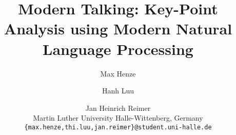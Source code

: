 \documentclass[11pt]{article}
\title{Modern Talking: Key-Point Analysis using Modern Natural Language Processing}
\author{%
  Max Henze \and Hanh Luu \and Jan Heinrich Reimer \\
  Martin Luther University Halle-Wittenberg, Germany \\ 
  \texttt{\{max.henze,thi.luu,jan.reimer\}@student.uni-halle.de}%
}
\begin{document}
\maketitle

\begin{abstract}
  
\end{abstract}








\appendix


\end{document}
